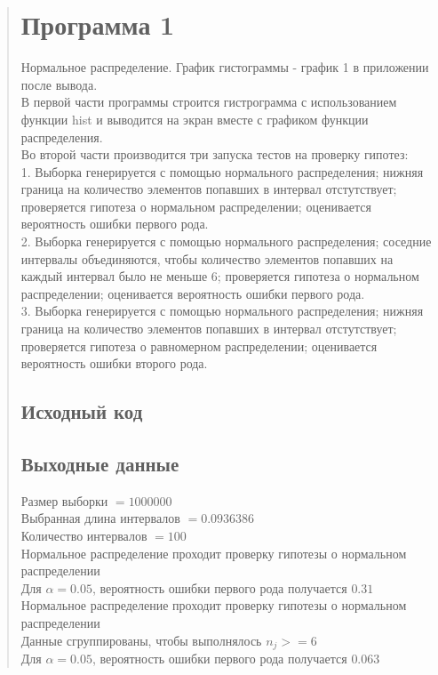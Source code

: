 \documentclass{article}
\begin{document}
\begin{quote}
\section{Программа 1}
	Нормальное распределение. График гистограммы - график 1 в приложении после вывода. \\
	В первой части программы строится гистрограмма с использованием функции hist и выводится на экран вместе с графиком функции распределения. \\
	Во второй части производится три запуска тестов на проверку гипотез: \\
	1. Выборка генерируется с помощью нормального распределения; нижняя граница на количество элементов попавших в интервал отстутствует; проверяется гипотеза о нормальном распределении; оценивается вероятность ошибки первого рода. \\
	2. Выборка генерируется с помощью нормального распределения; соседние интервалы объединяются, чтобы количество элементов попавших на каждый интервал было не меньше 6; проверяется гипотеза о нормальном распределении; оценивается вероятность ошибки первого рода. \\
	3. Выборка генерируется с помощью нормального распределения; нижняя граница на количество элементов попавших в интервал отстутствует; проверяется гипотеза о равномерном распределении; оценивается вероятность ошибки второго рода. \\
\subsection{Исходный код}
	
\subsection{Выходные данные}
	Размер выборки $= 1000000$ \\
	Выбранная длина интервалов $= 0.0936386$ \\
	Количество интервалов $= 100$ \\

	Нормальное распределение проходит проверку гипотезы о нормальном распределении \\
	Для $\alpha = 0.05$, вероятность ошибки первого рода получается $0.31$ \\

	Нормальное распределение проходит проверку гипотезы о нормальном распределении \\
	Данные сгруппированы, чтобы выполнялось $n_j >= 6$ \\
	Для $\alpha = 0.05$, вероятность ошибки первого рода получается $0.063$ \\


\end{quote}
\end{document}
